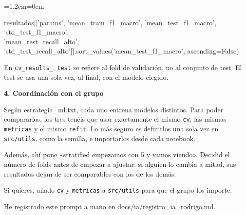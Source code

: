 \documentclass[11pt,a4paper]{article}
\newenvironment{codigo}
  {\par\smallskip\begin{list}{}{\leftmargin=1.2em\rightmargin=0em}\item\relax\ttfamily\scriptsize\raggedright}
  {\end{list}\smallskip}
\begin{document}
{\begin{codigo}
resultados[['params', 'mean\_\allowbreak{}train\_\allowbreak{}f1\_\allowbreak{}macro', 'mean\_\allowbreak{}test\_\allowbreak{}f1\_\allowbreak{}macro', 'std\_\allowbreak{}test\_\allowbreak{}f1\_\allowbreak{}macro', \\{}
\hspace*{6.24em}'mean\_\allowbreak{}test\_\allowbreak{}recall\_\allowbreak{}alto', 'std\_\allowbreak{}test\_\allowbreak{}recall\_\allowbreak{}alto']].sort\_\allowbreak{}values('mean\_\allowbreak{}test\_\allowbreak{}f1\_\allowbreak{}macro', ascending=False)
\end{codigo}
En \texttt{cv\_\allowbreak{}results\_\allowbreak{}}, \texttt{test} se refiere al fold de validación, no al conjunto de test. El test se usa una sola vez, al final, con el modelo elegido.

\textbf{4. Coordinación con el grupo}

Según estrategia\_\allowbreak{}ml.txt, cada uno entrena modelos distintos. Para poder compararlos, los tres tenéis que usar exactamente el mismo \texttt{cv}, las mismas \texttt{metricas} y el mismo \texttt{refit}. Lo más seguro es definirlos una sola vez en \texttt{src/\allowbreak{}utils}, como la semilla, e importarlos desde cada notebook.

Además, ahí pone «stratified empezamos con 5 y vamos viendo». Decidid el número de folds antes de empezar a ajustar: si alguien lo cambia a mitad, sus resultados dejan de ser comparables con los de los demás.

Si quieres, añado \texttt{cv} y \texttt{metricas} a \texttt{src/\allowbreak{}utils} para que el grupo los importe.

He registrado este prompt a mano en docs/\allowbreak{}ia/\allowbreak{}registro\_\allowbreak{}ia\_\allowbreak{}rodrigo.md.

}
\end{document}
